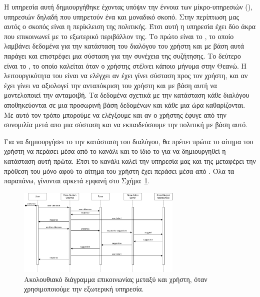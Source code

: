 Η υπηρεσία αυτή δημιουργήθηκε έχοντας υπόψιν την έννοια των μίκρο-υπηρεσιών (), υπηρεσιών δηλαδή που υπηρετούν ένα και μοναδικό σκοπό. Στην περίπτωση μας αυτός ο σκοπός είναι η περίκλειση της πολιτικής. Έτσι αυτή η υπηρεσία έχει δύο άκρα που επικοινωνεί με το εξωτερικό περιβάλλον της. Το πρώτο είναι το , το οποίο λαμβάνει δεδομένα για την κατάσταση του διαλόγου του χρήστη και με βάση αυτά παράγει και επιστρέφει μια σύσταση για την συνέχεια της συζήτησης. Το δεύτερο είναι το , το οποίο καλείται όταν ο χρήστης στέλνει κάποιο μήνυμα στην Θεανώ. Η λειτουργικότητα του είναι να ελέγχει αν έχει γίνει σύσταση προς τον χρήστη, και αν έχει γίνει να αξιολογεί την ανταπόκριση του χρήστη και με βάση αυτή να μοντελοποιεί την ανταμοιβή. Τα δεδομένα σχετικά με την κατάσταση κάθε διαλόγου αποθηκεύονται σε μια προσωρινή βάση δεδομένων και κάθε μια ώρα καθαρίζονται. Με αυτό τον τρόπο μπορούμε να ελέγξουμε και αν ο χρήστης έφυγε από την συνομιλία μετά απο μια σύσταση και να εκπαιδεύσουμε την πολιτική με βάση αυτό.

Για να δημιουργήσει το  την κατάσταση του διαλόγου, θα πρέπει πρώτα το αίτημα του χρήστη να περάσει μέσα από το κανάλι και το ίδιο το  για να δημιουργηθεί η κατάσταση αυτή πρώτα. Έτσι το κανάλι καλεί την υπηρεσία μας και της μεταφέρει την πρόθεση του μόνο αφού το αίτημα του χρήστη έχει περάσει μέσα από . Όλα τα παραπάνω, γίνονται αρκετά εμφανή στο Σχήμα~\ref{fig:rasa_sequence_smart_suggest_ms}.

\begin{figure}
    \centering
    \includegraphics[width=0.7\textwidth]{body_matter/our_work/images/Rasa_smart_service.png}
    \caption{Ακολουθιακό διάγραμμα επικοινωνίας μεταξύ  και χρήστη, όταν χρησιμοποιούμε την εξωτερική υπηρεσία.}
    \label{fig:rasa_sequence_smart_suggest_ms}
\end{figure}


